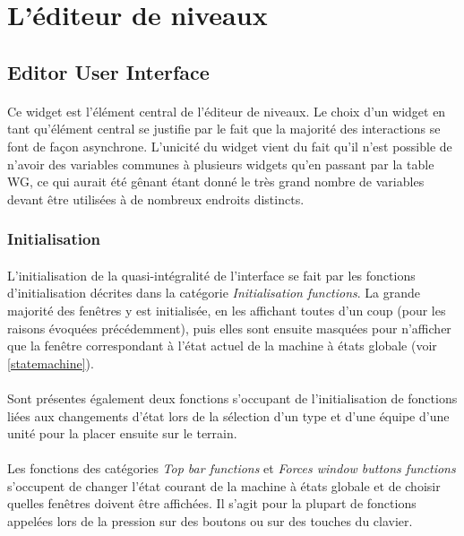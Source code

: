 \documentclass[a4paper]{article}
\begin{document}
\section{L'éditeur de niveaux}
\subsection{Editor User Interface}
\paragraph{}
Ce widget est l'élément central de l'éditeur de niveaux. Le choix d'un widget en tant qu'élément central se justifie par le fait que la majorité des interactions se font de façon asynchrone. L'unicité du widget vient du fait qu'il n'est possible de n'avoir des variables communes à plusieurs widgets qu'en passant par la table WG, ce qui aurait été gênant étant donné le très grand nombre de variables devant être utilisées à de nombreux endroits distincts.
\subsubsection{Initialisation}
\paragraph{}
L'initialisation de la quasi-intégralité de l'interface se fait par les fonctions d'initialisation décrites dans la catégorie \textit{Initialisation functions}. La grande majorité des fenêtres y est initialisée, en les affichant toutes d'un coup (pour les raisons évoquées précédemment), puis elles sont ensuite masquées pour n'afficher que la fenêtre correspondant à l'état actuel de la machine à états globale (voir \ref{statemachine}).
\paragraph{}
Sont présentes également deux fonctions s'occupant de l'initialisation de fonctions liées aux changements d'état lors de la sélection d'un type et d'une équipe d'une unité pour la placer ensuite sur le terrain.
\paragraph{}
Les fonctions des catégories \textit{Top bar functions} et \textit{Forces window buttons functions} s'occupent de changer l'état courant de la machine à états globale et de choisir quelles fenêtres doivent être affichées. Il s'agit pour la plupart de fonctions appelées lors de la pression sur des boutons ou sur des touches du clavier.
\end{document}
